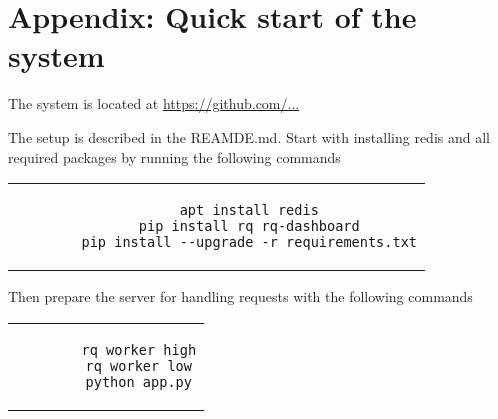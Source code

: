 \appendix
\chapter{Appendix: Quick start of the system}

The system is located at
\url{https://github.com/...}

The setup is described in the REAMDE.md.
Start with installing redis and all required packages by running the following commands

\begin{center}
	\begin{tabular}{c}
		\begin{lstlisting}
		apt install redis
		pip install rq rq-dashboard
		pip install --upgrade -r requirements.txt
		\end{lstlisting}
	\end{tabular}
\end{center}

Then prepare the server for handling requests with the following commands

\begin{center}
	\begin{tabular}{c}
		\begin{lstlisting}
		rq worker high
		rq worker low
		python app.py
		\end{lstlisting}
	\end{tabular}
\end{center}